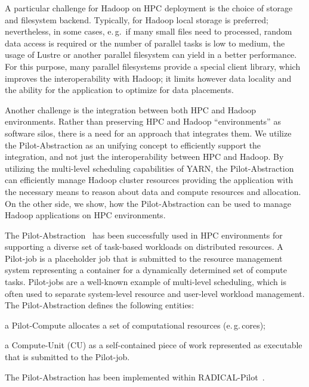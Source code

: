 A particular challenge for Hadoop on HPC deployment is the choice of storage and filesystem backend.
Typically, for Hadoop local storage is preferred; nevertheless, in some cases, e.\,g.\ if many small files need to processed, random data access is required or the number of parallel tasks is low to medium, the usage of Lustre or another parallel filesystem can yield in a better performance.
For this purpose, many parallel filesystems provide a special client library, which improves the interoperability with Hadoop; it limits however data locality and the ability for the application to optimize for data placements.

Another challenge is the integration between both HPC and Hadoop environments.
Rather than preserving HPC and Hadoop ``environments'' as software silos, there is a need for an approach that integrates them. 
We utilize the Pilot-Abstraction as an unifying concept to efficiently support the integration, and not just the interoperability between HPC and Hadoop.
By utilizing the multi-level scheduling capabilities of YARN, the Pilot-Abstraction can efficiently manage Hadoop cluster resources providing the application with the necessary means to reason about data and compute resources and allocation.
On the other side, we show, how the Pilot-Abstraction can be used to manage Hadoop applications on HPC environments.

The Pilot-Abstraction~\cite{luckow2012pstar} has been successfully used in HPC environments for supporting a diverse set of task-based workloads on distributed resources.
A Pilot-job is a placeholder job that is submitted to the resource management system representing a container for a dynamically determined set of compute tasks.
Pilot-jobs are a well-known example of multi-level scheduling, which is often used to separate system-level resource and user-level workload management.
The Pilot-Abstraction defines the following entities:
\begin{inparaenum} [(i)]
    \item a Pilot-Compute allocates a set of computational resources (e.\,g.\,cores);
    \item  a Compute-Unit (CU) as a self-contained piece of work represented as executable that is submitted to the Pilot-job.
\end{inparaenum}
The Pilot-Abstraction has been implemented within RADICAL-Pilot~\cite{merzky2018design}.


